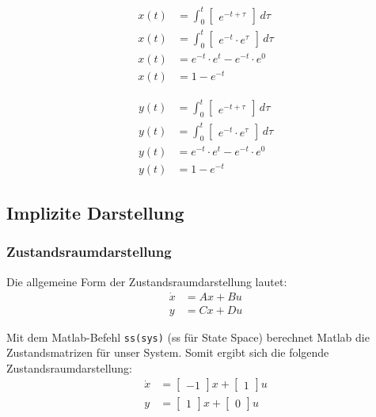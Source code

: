 \noindent
\begin{minipage}{.5\linewidth}   
    \begin{align*}
        x(t) & = \int_{0}^{t} \begin{bmatrix}e^{-t + \tau}\end{bmatrix} \,d\tau \\
        x(t) & = \int_{0}^{t} \begin{bmatrix}e^{-t} \cdot e^{\tau}\end{bmatrix} \,d\tau \\
        x(t) & = e^{-t} \cdot e^{t} - e^{-t} \cdot e^{0} \\
        x(t) & = 1 - e^{-t}
    \end{align*}
\end{minipage}
\begin{minipage}{.5\linewidth}   
    \begin{align*}
        y(t) & = \int_{0}^{t} \begin{bmatrix}e^{-t + \tau}\end{bmatrix} \,d\tau \\
        y(t) & = \int_{0}^{t} \begin{bmatrix}e^{-t} \cdot e^{\tau}\end{bmatrix} \,d\tau \\
        y(t) & = e^{-t} \cdot e^{t} - e^{-t} \cdot e^{0} \\
        y(t) & = 1 - e^{-t}
    \end{align*}
\end{minipage}

\subsection{Implizite Darstellung}
\subsubsection{Zustandsraumdarstellung}
Die allgemeine Form der Zustandsraumdarstellung lautet:
\begin{align*}
    \dot x & = Ax + Bu \nonumber \\
    y & = Cx + Du
\end{align*}

Mit dem Matlab-Befehl \texttt{ss(sys)} (ss für State Space) berechnet Matlab die Zustandsmatrizen für unser System. Somit ergibt sich die folgende Zustandsraumdarstellung:
\begin{align*}
    \dot x & = \begin{bmatrix}
        -1
    \end{bmatrix}x + \begin{bmatrix}
        1
    \end{bmatrix}u \\
    y & = \begin{bmatrix}
        1
    \end{bmatrix}x + \begin{bmatrix}
        0
    \end{bmatrix}u
\end{align*}

